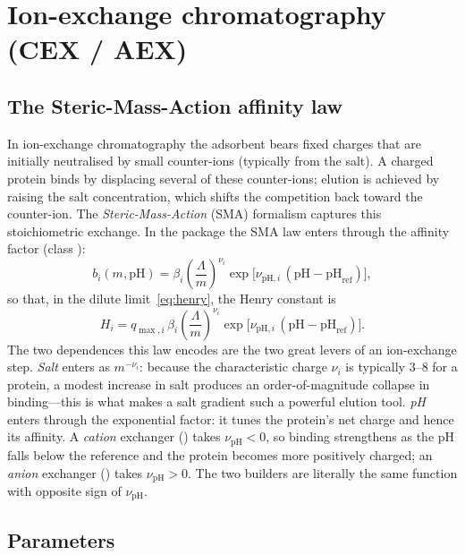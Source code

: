\section{Ion-exchange chromatography (CEX / AEX)}
\label{sec:iex}

\subsection{The Steric-Mass-Action affinity law}

In ion-exchange chromatography the adsorbent bears fixed charges that are
initially neutralised by small counter-ions (typically from the salt). A charged
protein binds by displacing several of these counter-ions; elution is achieved by
raising the salt concentration, which shifts the competition back toward the
counter-ion. The \emph{Steric-Mass-Action} (SMA) formalism captures this
stoichiometric exchange. In the package the SMA law enters through the affinity
factor (class ):
%
\begin{equation}
b_i(m,\mathrm{pH})
= \beta_i
\left(\frac{\Lambda}{m}\right)^{\nu_i}
\exp\!\bigl[\nu_{\mathrm{pH},i}\,(\mathrm{pH}-\mathrm{pH}_{\mathrm{ref}})\bigr],
\label{eq:sma}
\end{equation}
%
so that, in the dilute limit~\eqref{eq:henry}, the Henry constant is
%
\begin{equation}
H_i = q_{\max,i}\,\beta_i
\left(\frac{\Lambda}{m}\right)^{\nu_i}
\exp\!\bigl[\nu_{\mathrm{pH},i}\,(\mathrm{pH}-\mathrm{pH}_{\mathrm{ref}})\bigr].
\label{eq:smahenry}
\end{equation}
%
The two dependences this law encodes are the two great levers of an
ion-exchange step. \emph{Salt} enters as $m^{-\nu_i}$: because the
characteristic charge $\nu_i$ is typically $3$--$8$ for a protein, a modest
increase in salt produces an order-of-magnitude collapse in binding---this is
what makes a salt gradient such a powerful elution tool. \emph{pH} enters
through the exponential factor: it tunes the protein's net charge and hence its
affinity. A \emph{cation} exchanger () takes
$\nu_{\mathrm{pH}}<0$, so binding strengthens as the pH falls below the reference
and the protein becomes more positively charged; an \emph{anion} exchanger
() takes $\nu_{\mathrm{pH}}>0$. The two builders are
literally the same function with opposite sign of $\nu_{\mathrm{pH}}$.

\subsection{Parameters}

